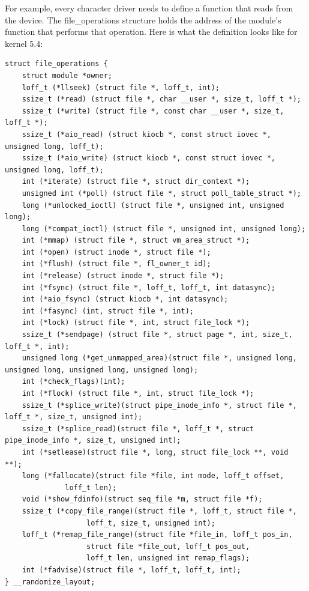 \documentclass[11pt]{article}
\begin{document}
For example, every character driver needs to define a function that reads from the device. The file\_operations structure holds the address of the module's function that performs that operation. Here is what the definition looks like for kernel 5.4:

\begin{verbatim}
struct file_operations {
    struct module *owner;
    loff_t (*llseek) (struct file *, loff_t, int);
    ssize_t (*read) (struct file *, char __user *, size_t, loff_t *);
    ssize_t (*write) (struct file *, const char __user *, size_t, loff_t *);
    ssize_t (*aio_read) (struct kiocb *, const struct iovec *, unsigned long, loff_t);
    ssize_t (*aio_write) (struct kiocb *, const struct iovec *, unsigned long, loff_t);
    int (*iterate) (struct file *, struct dir_context *);
    unsigned int (*poll) (struct file *, struct poll_table_struct *);
    long (*unlocked_ioctl) (struct file *, unsigned int, unsigned long);
    long (*compat_ioctl) (struct file *, unsigned int, unsigned long);
    int (*mmap) (struct file *, struct vm_area_struct *);
    int (*open) (struct inode *, struct file *);
    int (*flush) (struct file *, fl_owner_t id);
    int (*release) (struct inode *, struct file *);
    int (*fsync) (struct file *, loff_t, loff_t, int datasync);
    int (*aio_fsync) (struct kiocb *, int datasync);
    int (*fasync) (int, struct file *, int);
    int (*lock) (struct file *, int, struct file_lock *);
    ssize_t (*sendpage) (struct file *, struct page *, int, size_t, loff_t *, int);
    unsigned long (*get_unmapped_area)(struct file *, unsigned long, unsigned long, unsigned long, unsigned long);
    int (*check_flags)(int);
    int (*flock) (struct file *, int, struct file_lock *);
    ssize_t (*splice_write)(struct pipe_inode_info *, struct file *, loff_t *, size_t, unsigned int);
    ssize_t (*splice_read)(struct file *, loff_t *, struct pipe_inode_info *, size_t, unsigned int);
    int (*setlease)(struct file *, long, struct file_lock **, void **);
    long (*fallocate)(struct file *file, int mode, loff_t offset,
		      loff_t len);
    void (*show_fdinfo)(struct seq_file *m, struct file *f);
    ssize_t (*copy_file_range)(struct file *, loff_t, struct file *,
			       loff_t, size_t, unsigned int);
    loff_t (*remap_file_range)(struct file *file_in, loff_t pos_in,
			       struct file *file_out, loff_t pos_out,
			       loff_t len, unsigned int remap_flags);
    int (*fadvise)(struct file *, loff_t, loff_t, int);
} __randomize_layout;
\end{verbatim}
\end{document}
